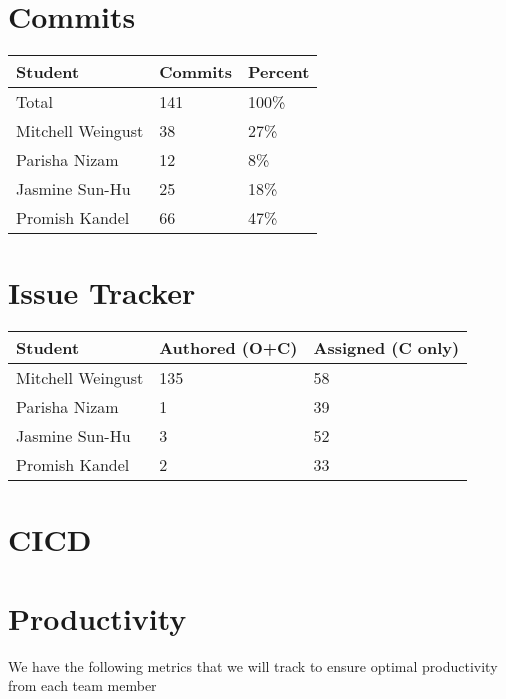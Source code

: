 \documentclass{article}
\begin{document}
\section{Commits}

\begin{table}[H]
\centering
\begin{tabular}{lll}
\toprule
\textbf{Student} & \textbf{Commits} & \textbf{Percent}\\
\midrule
Total & 141 & 100\% \\
Mitchell Weingust & 38 & 27\% \\
Parisha Nizam & 12 & 8\% \\
Jasmine Sun-Hu & 25 & 18\% \\
Promish Kandel & 66 & 47\% \\
\bottomrule
\end{tabular}
\end{table}


\section{Issue Tracker}

\begin{table}[H]
\centering
\begin{tabular}{lll}
\toprule
\textbf{Student} & \textbf{Authored (O+C)} & \textbf{Assigned (C only)}\\
\midrule
Mitchell Weingust & 135 & 58 \\
Parisha Nizam & 1 & 39 \\
Jasmine Sun-Hu & 3 & 52 \\
Promish Kandel & 2 & 33 \\
\bottomrule
\end{tabular}
\end{table}


\section{CICD}


\section{Productivity}
We have the following metrics that we will track to ensure optimal productivity from each team member
\end{document}
